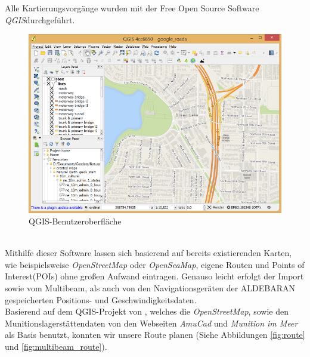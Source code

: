 Alle Kartierungsvorgänge wurden mit der Free Open Source Software\\
\emph{QGIS}\cite{qgis}durchgeführt.
\begin{figure}[ht]
    \centering
    \includegraphics[width=.4\linewidth]{Bilder/QGIS/about-screenshot.png}
    \caption[fig:qgisabout]{QGIS-Benutzeroberfläche}
\end{figure}
\\Mithilfe dieser Software lassen sich basierend auf bereits existierenden Karten, 
wie beispielsweise \emph{OpenStreetMap}\cite{ostrm} oder \emph{OpenSeaMap}\cite{oseam},
eigene Routen und Points of \\Interest(POIs) ohne großen Aufwand eintragen. Genauso 
leicht erfolgt der Import sowie vom Multibeam,  als auch von den Navigationsgeräten 
der ALDEBARAN gespeicherten Positions- und Geschwindigkeitsdaten.\\


Basierend auf dem QGIS-Projekt von \jens, welches die \emph{OpenStreetMap}, sowie den Munitionslagerstättendaten von den Webseiten
\emph{AmuCad}\cite{amucad} und \emph{Munition im Meer}\cite{muninmeer}
als Basis benutzt, konnten wir unsere Route planen (Siehe Abbildungen \ref{fig:route} und \ref{fig:multibeam_route}).

